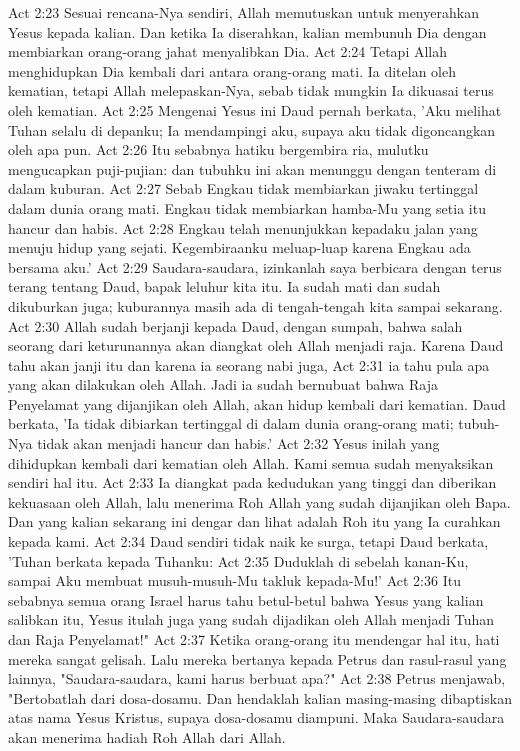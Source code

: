 Act 2:23  Sesuai rencana-Nya sendiri, Allah memutuskan untuk menyerahkan Yesus kepada kalian. Dan ketika Ia diserahkan, kalian membunuh Dia dengan membiarkan orang-orang jahat menyalibkan Dia.
Act 2:24  Tetapi Allah menghidupkan Dia kembali dari antara orang-orang mati. Ia ditelan oleh kematian, tetapi Allah melepaskan-Nya, sebab tidak mungkin Ia dikuasai terus oleh kematian.
Act 2:25  Mengenai Yesus ini Daud pernah berkata, 'Aku melihat Tuhan selalu di depanku; Ia mendampingi aku, supaya aku tidak digoncangkan oleh apa pun.
Act 2:26  Itu sebabnya hatiku bergembira ria, mulutku mengucapkan puji-pujian: dan tubuhku ini akan menunggu dengan tenteram di dalam kuburan.
Act 2:27  Sebab Engkau tidak membiarkan jiwaku tertinggal dalam dunia orang mati. Engkau tidak membiarkan hamba-Mu yang setia itu hancur dan habis.
Act 2:28  Engkau telah menunjukkan kepadaku jalan yang menuju hidup yang sejati. Kegembiraanku meluap-luap karena Engkau ada bersama aku.'
Act 2:29  Saudara-saudara, izinkanlah saya berbicara dengan terus terang tentang Daud, bapak leluhur kita itu. Ia sudah mati dan sudah dikuburkan juga; kuburannya masih ada di tengah-tengah kita sampai sekarang.
Act 2:30  Allah sudah berjanji kepada Daud, dengan sumpah, bahwa salah seorang dari keturunannya akan diangkat oleh Allah menjadi raja. Karena Daud tahu akan janji itu dan karena ia seorang nabi juga,
Act 2:31  ia tahu pula apa yang akan dilakukan oleh Allah. Jadi ia sudah bernubuat bahwa Raja Penyelamat yang dijanjikan oleh Allah, akan hidup kembali dari kematian. Daud berkata, 'Ia tidak dibiarkan tertinggal di dalam dunia orang-orang mati; tubuh-Nya tidak akan menjadi hancur dan habis.'
Act 2:32  Yesus inilah yang dihidupkan kembali dari kematian oleh Allah. Kami semua sudah menyaksikan sendiri hal itu.
Act 2:33  Ia diangkat pada kedudukan yang tinggi dan diberikan kekuasaan oleh Allah, lalu menerima Roh Allah yang sudah dijanjikan oleh Bapa. Dan yang kalian sekarang ini dengar dan lihat adalah Roh itu yang Ia curahkan kepada kami.
Act 2:34  Daud sendiri tidak naik ke surga, tetapi Daud berkata, 'Tuhan berkata kepada Tuhanku:
Act 2:35  Duduklah di sebelah kanan-Ku, sampai Aku membuat musuh-musuh-Mu takluk kepada-Mu!'
Act 2:36  Itu sebabnya semua orang Israel harus tahu betul-betul bahwa Yesus yang kalian salibkan itu, Yesus itulah juga yang sudah dijadikan oleh Allah menjadi Tuhan dan Raja Penyelamat!"
Act 2:37  Ketika orang-orang itu mendengar hal itu, hati mereka sangat gelisah. Lalu mereka bertanya kepada Petrus dan rasul-rasul yang lainnya, "Saudara-saudara, kami harus berbuat apa?"
Act 2:38  Petrus menjawab, "Bertobatlah dari dosa-dosamu. Dan hendaklah kalian masing-masing dibaptiskan atas nama Yesus Kristus, supaya dosa-dosamu diampuni. Maka Saudara-saudara akan menerima hadiah Roh Allah dari Allah.

